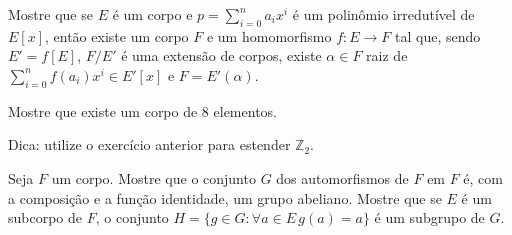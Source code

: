 \begin{exer}
 Mostre que se $E$ é um corpo e $p=\sum_{i=0}^n a_i x^i$ é um polinômio irredutível de $E[x]$, então existe um corpo $F$ e um homomorfismo $f:E\rightarrow F$ tal que, sendo $E'=f[E]$, $F/E'$ é uma extensão de corpos, existe $\alpha\in F$ raiz de $\sum_{i=0}^n f(a_i)x^i \in E'[x]$ e $F=E'(\alpha)$.
\end{exer}

\begin{exer}
 Mostre que existe um corpo de 8 elementos.

 Dica: utilize o exercício anterior para estender $\mathbb Z_2$.
\end{exer}

\begin{exer}
Seja $F$ um corpo. Mostre que o conjunto $G$ dos automorfismos de $F$ em $F$ é, com a composição e a função identidade, um grupo abeliano.
Mostre que se $E$ é um subcorpo de $F$, o conjunto $H=\{g \in G: \forall a \in E\, g(a)=a\}$ é um subgrupo de $G$.
\end{exer}

